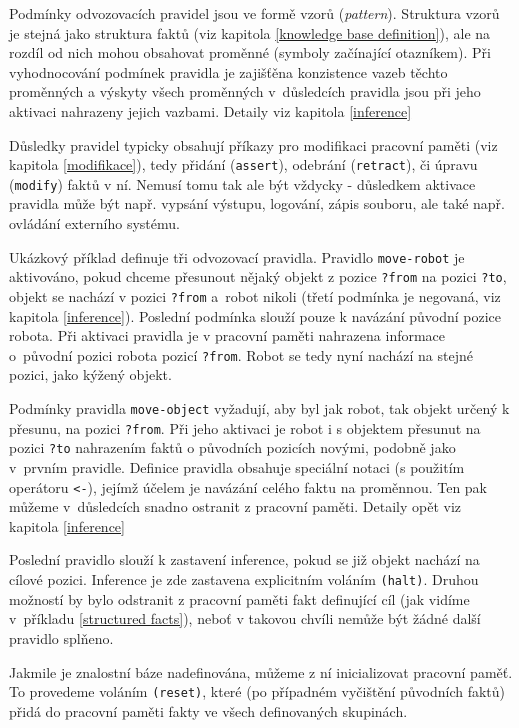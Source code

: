 Podmínky odvozovacích pravidel jsou ve formě vzorů (\emph{pattern}). Struktura
vzorů je stejná jako struktura faktů (viz kapitola \ref{knowledge base
definition}), ale na rozdíl od nich mohou obsahovat proměnné (symboly začínající
otazníkem).  Při vyhodnocování podmínek pravidla je zajišťěna
konzistence vazeb těchto proměnných a výskyty všech proměnných v~důsledcích
pravidla jsou při jeho aktivaci nahrazeny jejich vazbami. Detaily viz kapitola
\ref{inference}

Důsledky pravidel typicky obsahují příkazy pro modifikaci pracovní paměti (viz
kapitola \ref{modifikace}), tedy přidání (\verb|assert|), odebrání
(\verb|retract|), či úpravu (\verb|modify|) faktů v ní. Nemusí tomu tak ale být
vždycky - důsledkem aktivace pravidla může být např. vypsání výstupu, logování,
zápis souboru, ale také např. ovládání externího systému.

Ukázkový příklad definuje tři odvozovací pravidla. Pravidlo
\verb|move-robot| je aktivováno, pokud chceme přesunout nějaký objekt z pozice
\verb|?from| na pozici \verb|?to|, objekt se nachází v pozici \verb|?from|
a~robot nikoli (třetí podmínka je negovaná, viz kapitola \ref{inference}).
Poslední podmínka slouží pouze k navázání původní pozice robota.  Při aktivaci
pravidla je v pracovní paměti nahrazena informace o~původní pozici robota
pozicí \verb|?from|. Robot se tedy nyní nachází na stejné pozici, jako kýžený
objekt.

Podmínky pravidla \verb|move-object| vyžadují, aby byl jak robot, tak objekt
určený k přesunu, na pozici \verb|?from|. Při jeho aktivaci je robot i s objektem
přesunut na pozici \verb|?to| nahrazením faktů o původních pozicích novými,
podobně jako v~prvním pravidle. Definice pravidla obsahuje speciální notaci (s
použitím operátoru \verb|<-|), jejímž účelem je navázání celého faktu na
proměnnou. Ten pak můžeme v~důsledcích snadno ostranit z pracovní paměti.
Detaily opět viz kapitola \ref{inference}

Poslední pravidlo slouží k zastavení inference, pokud se již objekt nachází na
cílové pozici. Inference je zde zastavena explicitním voláním \verb|(halt)|.
Druhou možností by bylo odstranit z pracovní paměti fakt definující cíl (jak
vidíme v~příkladu \ref{structured facts}), neboť v takovou chvíli nemůže být
žádné další pravidlo splňeno.

Jakmile je znalostní báze nadefinována, můžeme z ní inicializovat pracovní
paměť. To provedeme voláním \verb|(reset)|, které (po případném vyčištění
původních faktů) přidá do pracovní paměti fakty ve všech definovaných skupinách.

